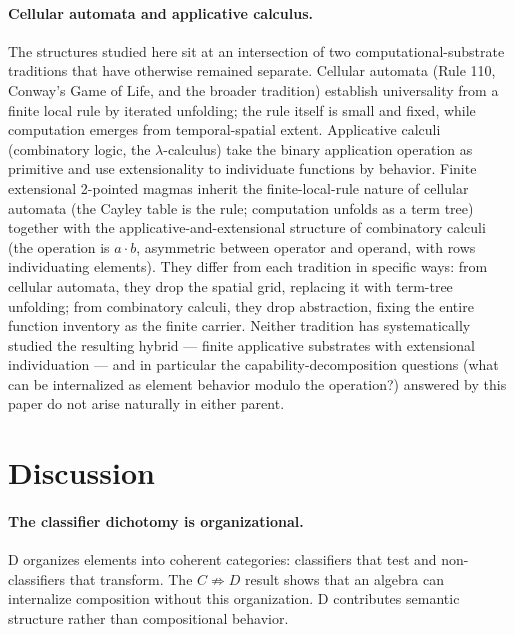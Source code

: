 \documentclass[sigconf,screen]{acmart}
\newcommand{\dotop}{\cdot}
\theoremstyle{remark}
\begin{document}
\paragraph{Cellular automata and applicative calculus.}
The structures studied here sit at an intersection of two computational-substrate traditions that have otherwise remained separate. Cellular automata (Rule 110, Conway's Game of Life, and the broader tradition) establish universality from a finite local rule by iterated unfolding; the rule itself is small and fixed, while computation emerges from temporal-spatial extent. Applicative calculi (combinatory logic, the $\lambda$-calculus) take the binary application operation as primitive and use extensionality to individuate functions by behavior. Finite extensional 2-pointed magmas inherit the finite-local-rule nature of cellular automata (the Cayley table is the rule; computation unfolds as a term tree) together with the applicative-and-extensional structure of combinatory calculi (the operation is $a \dotop b$, asymmetric between operator and operand, with rows individuating elements). They differ from each tradition in specific ways: from cellular automata, they drop the spatial grid, replacing it with term-tree unfolding; from combinatory calculi, they drop abstraction, fixing the entire function inventory as the finite carrier. Neither tradition has systematically studied the resulting hybrid --- finite applicative substrates with extensional individuation --- and in particular the capability-decomposition questions (what can be internalized as element behavior modulo the operation?) answered by this paper do not arise naturally in either parent.

\section{Discussion}
\label{sec:discussion}

\paragraph{The classifier dichotomy is organizational.}
D organizes elements into coherent categories: classifiers that test and non-classifiers that transform. The $C \not\Rightarrow D$ result shows that an algebra can internalize composition without this organization. D contributes semantic structure rather than compositional behavior.
\end{document}
